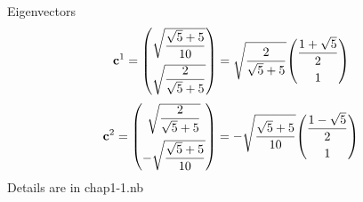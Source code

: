 \documentclass[a4paper]{article}
\numberwithin{equation}{subsection}
\newcommand{\code}[1]{\colorbox{codegray}{{\Consolas#1}}}
\begin{document}
Eigenvectors
\begin{equation}\label{key}
\vb{c}^1 
= \mqty(\sqrt{\dfrac{\sqrt{5}+5}{10}}\vspace{5pt}\\ \sqrt{\dfrac{2}{\sqrt{5}+5}}) 
= \sqrt{\dfrac{2}{\sqrt{5}+5}} 
\mqty(\dfrac{1+\sqrt{5}}{2} \vspace{5pt}\\1) 
\end{equation}
\begin{equation}\label{key}
\vb{c}^2
= \mqty(\sqrt{\dfrac{2}{\sqrt{5}+5}}\vspace{5pt}\\ -\sqrt{\dfrac{\sqrt{5}+5}{10}}) 
= -\sqrt{\dfrac{\sqrt{5}+5}{10}}
\mqty(\dfrac{1-\sqrt{5}}{2} \vspace{5pt}\\1) 
\end{equation}
Details are in \code{chap1-1.nb}
\end{document}
